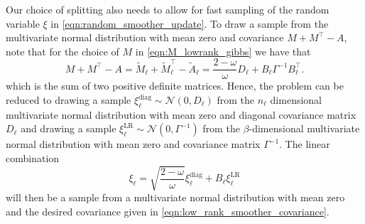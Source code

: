 \documentclass[11pt,english]{article}
\theoremstyle{plain}
\theoremstyle{plain}
\theoremstyle{plain}
\theoremstyle{plain}
\numberwithin{equation}{section}
\begin{document}
Our choice of splitting also needs to allow for fast sampling of the random variable $\xi$ in \eqref{eqn:random_smoother_update}. To draw a sample from the multivariate normal distribution with mean zero and covariance $M+M^\top-A$, note that for the choice of $M$ in \eqref{eqn:M_lowrank_gibbs} we have that
\begin{equation}
        M+M^\top-A = \widetilde{M}_\ell + \widetilde{M}_\ell^\top - \widetilde{A}_\ell  =\frac{2-\omega}{\omega} D_\ell + B_{\ell} \Gamma^{-1} B_{\ell}^{\top}.
        \label{eqn:low_rank_smoother_covariance}
\end{equation}
which is the sum of two positive definite matrices. Hence, the problem can be reduced to drawing a sample $\xi^{\mathrm{diag}}_\ell\sim \mathcal{N}(0,D_\ell)$ from the $n_\ell$ dimensional multivariate normal distribution with mean zero and diagonal covariance matrix $D_\ell$ and drawing a sample $\xi^\mathrm{LR}_\ell\sim \mathcal{N}(0,\Gamma^{-1})$ from the $\beta$-dimensional multivariate normal distribution with mean zero and covariance matrix $\Gamma^{-1}$. The linear combination
\begin{equation}
    \xi_\ell = \sqrt{\frac{2-\omega}{\omega}} \xi_\ell^{\mathrm{diag}} + B_{\ell} \xi_\ell^{\mathrm{LR}}
\end{equation}
will then be a sample from a multivariate normal distribution with mean zero and the desired covariance given in \eqref{eqn:low_rank_smoother_covariance}.
\end{document}

